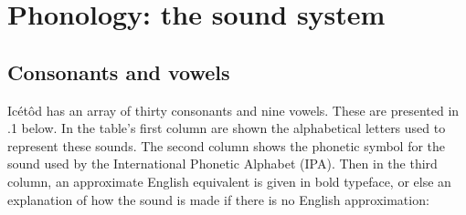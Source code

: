 \section{Phonology: the sound system}
 
\subsection{Consonants and vowels}


Icétôd has an array of thirty consonants\textsc{} and nine vowels. These are presented in .1 below. In the table’s first column are shown the alphabetical letters used to represent these sounds. The second column shows the phonetic symbol for the sound used by the International Phonetic Alphabet (IPA). Then in the third column, an approximate English equivalent is given in bold typeface, or else an explanation of how the sound is made if there is no English approximation:



